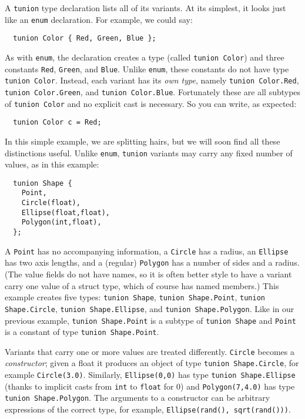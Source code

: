 A \texttt{tunion} type declaration lists all of its variants.  At its
simplest, it looks just like an \texttt{enum} declaration.  For example,
we could say:

\begin{verbatim}
  tunion Color { Red, Green, Blue };
\end{verbatim}

As with \texttt{enum}, the declaration creates a type (called
\texttt{tunion Color}) and three constants \texttt{Red}, \texttt{Green}, and
\texttt{Blue}.  Unlike \texttt{enum}, these constants do not have type
\texttt{tunion Color}.  Instead, each variant has its \textit{own type},
namely \texttt{tunion Color.Red}, \texttt{tunion Color.Green}, and
\texttt{tunion Color.Blue}.  Fortunately these are all subtypes of
\texttt{tunion Color} and no explicit cast is necessary.  So you can
write, as expected:

\begin{verbatim}
  tunion Color c = Red;
\end{verbatim}

In this simple example, we are splitting hairs, but we will soon find
all these distinctions useful.  Unlike \texttt{enum}, \texttt{tunion}
variants may carry any fixed number of values, as in this example:

\begin{verbatim}
  tunion Shape {
    Point,
    Circle(float),
    Ellipse(float,float),
    Polygon(int,float),
  };
\end{verbatim}

A \texttt{Point} has no accompanying information, a \texttt{Circle} has a
radius, an \texttt{Ellipse} has two axis lengths, and a (regular)
\texttt{Polygon} has a number of sides and a radius.  (The value fields
do not have names, so it is often better style to have a variant carry
one value of a struct type, which of course has named members.)  This
example creates five types: \texttt{tunion Shape},
\texttt{tunion Shape.Point}, \texttt{tunion Shape.Circle},
\texttt{tunion Shape.Ellipse}, and \texttt{tunion Shape.Polygon}.  Like in
our previous example, \texttt{tunion Shape.Point} is a subtype of
\texttt{tunion Shape} and \texttt{Point} is a constant of
type \texttt{tunion Shape.Point}.

Variants that carry one or more values are treated differently.
\texttt{Circle} becomes a \textit{constructor}; given a float it produces an
object of type \texttt{tunion Shape.Circle}, for example \texttt{Circle(3.0)}.
Similarly, \texttt{Ellipse(0,0)} has type \texttt{tunion Shape.Ellipse}
(thanks to implicit casts from \texttt{int} to \texttt{float} for 0) and
\texttt{Polygon(7,4.0)} has type \texttt{tunion Shape.Polygon}.  The
arguments to a constructor can be arbitrary expressions of the correct
type, for example, \texttt{Ellipse(rand(), sqrt(rand()))}.

